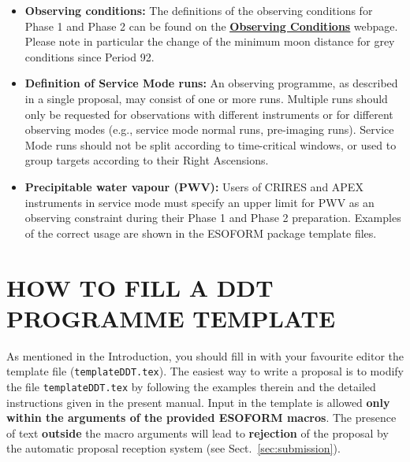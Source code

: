 \documentclass{article}
\begin{document}
\begin{itemize}

 \item{\bf Observing conditions:} The definitions of the observing conditions for Phase 1 and Phase 2
   can be found on the  \href{http://www.eso.org/sci/observing/phase2/ObsConditions.html}{\bf \underline{Observing Conditions}} webpage.
Please note in particular the change of the minimum moon distance for grey conditions since Period 92.

\item{\bf Definition of Service Mode runs: }
  An observing programme, as described in a single proposal, may consist of one or more runs.
  Multiple runs should only be requested for observations with different instruments or for different
  observing modes (e.g., service mode normal runs, pre-imaging runs).
 Service Mode runs should not be split
 according to time-critical windows, or used to group targets according to their Right Ascensions.



\item \textbf{Precipitable water vapour (PWV):} Users of
  CRIRES and APEX instruments in service mode must specify an upper limit for PWV
  as an observing constraint during their Phase 1 and Phase 2
  preparation. Examples of the correct usage are shown in the ESOFORM package
  template files.

%


\end{itemize}


\section{HOW TO FILL A DDT PROGRAMME TEMPLATE}
\label{sec:normal}

As mentioned in the Introduction, you should fill in with your
favourite editor the template file ({\tt templateDDT.tex}). 
The easiest way to write a proposal is to modify the
file {\tt templateDDT.tex} by following the examples therein and the
detailed instructions given in the present manual. Input in the
template is allowed {\bf only within the arguments of the provided
  ESOFORM macros}. The presence of text {\bf outside} the macro
arguments will lead to {\bf rejection} of the proposal by the
automatic proposal reception system (see Sect.~\ref{sec:submission}). 
\end{document}
